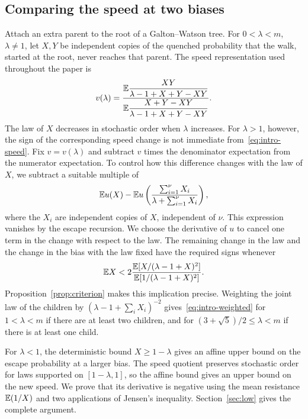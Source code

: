 \subsection{Comparing the speed at two biases}
Attach an extra parent to the root of a Galton--Watson tree. For $0<\lambda<m$, $\lambda\ne1$, let $X,Y$ be independent copies of the quenched probability that the walk, started at the root, never reaches that parent. The speed representation used throughout the paper is
\begin{equation}\label{eq:intro-speed}
 v(\lambda)=
 \frac{\displaystyle\mathbb E\frac{XY}{\lambda-1+X+Y-XY}}
 {\displaystyle\mathbb E\frac{X+Y-XY}{\lambda-1+X+Y-XY}}.
\end{equation}
The law of $X$ decreases in stochastic order when $\lambda$ increases. For $\lambda>1$, however, the sign of the corresponding speed change is not immediate from~\eqref{eq:intro-speed}. Fix $v=v(\lambda)$ and subtract $v$ times the denominator expectation from the numerator expectation. To control how this difference changes with the law of $X$, we subtract a suitable multiple of
\begin{equation*}
 \mathbb E u(X)-\mathbb E u\left(\frac{\sum_{i=1}^{\nu}X_i}{\lambda+\sum_{i=1}^{\nu}X_i}\right),
\end{equation*}
where the $X_i$ are independent copies of $X$, independent of $\nu$. This expression vanishes by the escape recursion. We choose the derivative of $u$ to cancel one term in the change with respect to the law. The remaining change in the law and the change in the bias with the law fixed have the required signs whenever
\begin{equation}\label{eq:intro-weighted}
 \mathbb E X<2\frac{\mathbb E[X/(\lambda-1+X)^2]}{\mathbb E[1/(\lambda-1+X)^2]}.
\end{equation}
Proposition~\ref{prop:criterion} makes this implication precise. Weighting the joint law of the children by $(\lambda-1+\sum_iX_i)^{-2}$ gives~\eqref{eq:intro-weighted} for $1<\lambda<m$ if there are at least two children, and for $(3+\sqrt5)/2\le\lambda<m$ if there is at least one child.

For $\lambda<1$, the deterministic bound $X\ge1-\lambda$ gives an affine upper bound on the escape probability at a larger bias. The speed quotient preserves stochastic order for laws supported on $[1-\lambda,1]$, so the affine bound gives an upper bound on the new speed. We prove that its derivative is negative using the mean resistance $\mathbb E(1/X)$ and two applications of Jensen's inequality. Section~\ref{sec:low} gives the complete argument.

